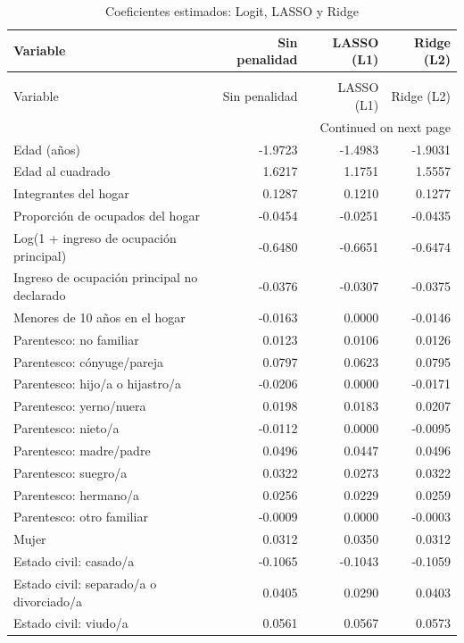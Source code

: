 \begin{longtable}{p{7cm}rrr}
\caption{Coeficientes estimados: Logit, LASSO y Ridge} \label{tab:coeficientes_logit} \\
\toprule
Variable & Sin penalidad & LASSO (L1) & Ridge (L2) \\
\midrule
\endfirsthead
\caption[]{Coeficientes estimados: Logit, LASSO y Ridge} \\
\toprule
Variable & Sin penalidad & LASSO (L1) & Ridge (L2) \\
\midrule
\endhead
\midrule
\multicolumn{4}{r}{Continued on next page} \\
\midrule
\endfoot
\bottomrule
\endlastfoot
Edad (años) & -1.9723 & -1.4983 & -1.9031 \\
Edad al cuadrado & 1.6217 & 1.1751 & 1.5557 \\
Integrantes del hogar & 0.1287 & 0.1210 & 0.1277 \\
Proporción de ocupados del hogar & -0.0454 & -0.0251 & -0.0435 \\
Log(1 + ingreso de ocupación principal) & -0.6480 & -0.6651 & -0.6474 \\
Ingreso de ocupación principal no declarado & -0.0376 & -0.0307 & -0.0375 \\
Menores de 10 años en el hogar & -0.0163 & 0.0000 & -0.0146 \\
Parentesco: no familiar & 0.0123 & 0.0106 & 0.0126 \\
Parentesco: cónyuge/pareja & 0.0797 & 0.0623 & 0.0795 \\
Parentesco: hijo/a o hijastro/a & -0.0206 & 0.0000 & -0.0171 \\
Parentesco: yerno/nuera & 0.0198 & 0.0183 & 0.0207 \\
Parentesco: nieto/a & -0.0112 & 0.0000 & -0.0095 \\
Parentesco: madre/padre & 0.0496 & 0.0447 & 0.0496 \\
Parentesco: suegro/a & 0.0322 & 0.0273 & 0.0322 \\
Parentesco: hermano/a & 0.0256 & 0.0229 & 0.0259 \\
Parentesco: otro familiar & -0.0009 & 0.0000 & -0.0003 \\
Mujer & 0.0312 & 0.0350 & 0.0312 \\
Estado civil: casado/a & -0.1065 & -0.1043 & -0.1059 \\
Estado civil: separado/a o divorciado/a & 0.0405 & 0.0290 & 0.0403 \\
Estado civil: viudo/a & 0.0561 & 0.0567 & 0.0573 \\

\end{longtable}
